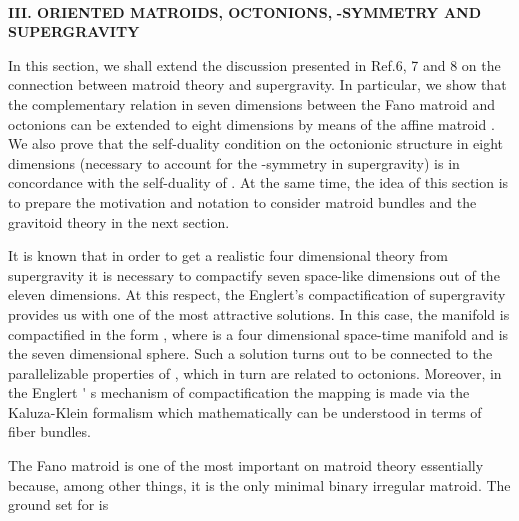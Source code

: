 \documentclass[a4paper,12pt]{article}
\begin{document}
\smallskip\ 

\noindent \textbf{III. ORIENTED MATROIDS, OCTONIONS, }\coordHE{}\textbf{%
-SYMMETRY AND }\coordHE{} \textbf{SUPERGRAVITY}

\bigskip

In this section, we shall extend the discussion presented in Ref.6, 7 and 8
on the connection between matroid theory and \coordHE{} supergravity. In
particular, we show that the complementary relation in seven dimensions
between the Fano matroid \coordHE{} and octonions can be extended to eight
dimensions by means of the affine matroid \coordHE{}. We also prove that the
self-duality condition on the octonionic structure in eight dimensions
(necessary to account for the \coordHE{}-symmetry in \coordHE{} supergravity) is in
concordance with the self-duality of \coordHE{}. At the same time, the idea
of this section is to prepare the motivation and notation to consider
matroid bundles and the gravitoid theory in the next section.

It is known that in order to get a realistic four dimensional theory from \coordHE{} supergravity it is necessary to compactify seven space-like dimensions
out of the eleven dimensions. At this respect, the Englert's compactification%
\coordHE{} of \coordHE{} supergravity provides us with one of the most attractive
solutions. In this case, the \coordHE{} manifold \coordHE{} is compactified in the
form \coordHE{}, where \coordHE{} is a four dimensional space-time
manifold and \coordHE{} is the seven dimensional sphere. Such a solution turns
out to be connected to the parallelizable properties of \coordHE{}, which in
turn are related to octonions.\coordHE{} Moreover, in the Englert%
\'{}%
s mechanism of compactification the mapping \coordHE{} is made via the Kaluza-Klein formalism which mathematically can be
understood in terms of fiber bundles.

The Fano matroid \coordHE{} is one of the most important on matroid theory
essentially because, among other things, it is the only minimal binary
irregular matroid. The ground set for \coordHE{} is
\end{document}
